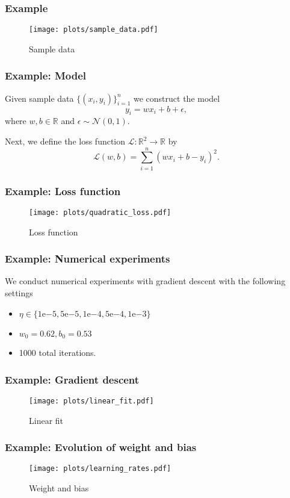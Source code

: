 \documentclass[17pt,institute=e10]{tuhh_presentation}
\newcommand{\R}{\mathbb{R}}
\newcommand{\CL}{\mathcal{L}}
\newcommand{\expnumber}[2]{{#1}\mathrm{e}{#2}}
\begin{document}
\begin{frame}[fragile]
  \frametitle{Example}
  
    \vspace{-1cm}
    \begin{figure}
      \centering
      \texttt{[image: plots/sample\_data.pdf]}
      \caption{Sample data}
    \end{figure}
\end{frame}
\begin{frame}[fragile]
  \frametitle{Example: Model}
  Given sample data $\{(x_i,y_i)\}_{i=1}^n$ we construct the model
  \begin{equation*}
    y_i = w x_i + b + \epsilon,
  \end{equation*}
  where $w, b \in \R$ and $\epsilon \sim \mathcal{N}(0,1)$.

  Next, we define the loss function $\CL : \R^2 \rightarrow \R$ by
  \begin{equation*}
    \CL(w,b) = \sum_{i = 1}^{n} \left(w x_i + b - y_i\right)^2.
  \end{equation*}
\end{frame}
\begin{frame}[fragile]
  \frametitle{Example: Loss function}
    \vspace{-1cm}
    \begin{figure}
      \centering
      \texttt{[image: plots/quadratic\_loss.pdf]}
      \caption{Loss function}
    \end{figure}
\end{frame}
\begin{frame}[fragile]
  \frametitle{Example: Numerical experiments}
  We conduct numerical experiments with gradient descent with the following settings
  \begin{itemize}
    \item $\eta \in \{\expnumber{1}{-5},\expnumber{5}{-5}, \expnumber{1}{-4}, \expnumber{5}{-4}, \expnumber{1}{-3}\}$
    \item $w_0 = 0.62, b_0 = 0.53$
    \item 1000 total iterations.
  \end{itemize}
\end{frame}
\begin{frame}[fragile]
  \frametitle{Example: Gradient descent}
    \vspace{-1cm}
    \begin{figure}
      \centering
      \texttt{[image: plots/linear\_fit.pdf]}
      \caption{Linear fit}
    \end{figure}
\end{frame}
\begin{frame}[fragile]
  \frametitle{Example: Evolution of weight and bias}
    \vspace{-1cm}
    \begin{figure}
      \centering
      \texttt{[image: plots/learning\_rates.pdf]}
      \caption{Weight and bias}
    \end{figure}
\end{frame}
\end{document}
